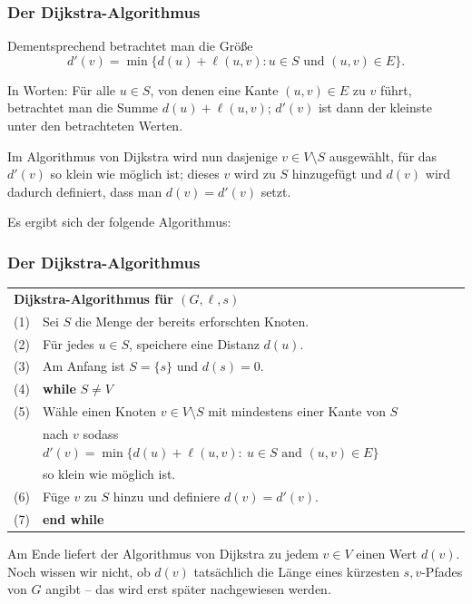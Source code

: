 \documentclass[smaller]{beamer}
\begin{document}
\begin{frame}
\frametitle{Der Dijkstra-Algorithmus}
Dementsprechend betrachtet man die Größe
\[
d'(v) = \min{\big\{ d(u) + \ell(u,v) : u \in S \text{ und } (u,v) \in E \big\}}.
\]

In Worten: Für alle $u \in S$, von denen eine Kante $(u,v) \in E$ zu $v$ führt, betrachtet man die Summe $d(u) + \ell(u,v)$; $d'(v)$ ist dann der kleinste unter den betrachteten Werten. \\ \vspace*{0.2cm}

Im Algorithmus von Dijkstra wird nun dasjenige $v \in V \setminus S$ ausgewählt, für das $d'(v)$ so klein wie möglich ist; dieses $v$ wird zu $S$ hinzugefügt und $d(v)$ wird dadurch definiert, dass man $d(v) = d'(v)$ setzt. \\ \vspace*{0.2cm}

Es ergibt sich der folgende Algorithmus:
\end{frame}

\begin{frame}
\frametitle{Der Dijkstra-Algorithmus}
\begin{center}
\label{page:12:1}
\begin{tabular}{rl}
\multicolumn{2}{l}{\textbf{Dijkstra-Algorithmus für $(G, \ell, s)$}} \\
 (1)& Sei $S$ die Menge der bereits erforschten Knoten. \\
 (2)& Für jedes $u \in S$, speichere eine Distanz $d(u)$. \\
 (3)& Am Anfang ist $S = \{ s \}$ und $d(s)=0$. \\
 (4)& \textbf{while} $S \neq V$ \\
 (5)& \qquad Wähle einen Knoten $v \in V \setminus S$ mit mindestens einer Kante von $S$  \\
    & \qquad nach $v$ sodass $d'(v) = \min{\{ d(u) + \ell(u,v) : \ u \in S \text{ and } (u,v) \in E \}}$ \\
    & \qquad so klein wie möglich ist. \\
 (6)& \qquad Füge $v$ zu $S$ hinzu und definiere $d(v) = d'(v)$. \\
 (7)& \textbf{end while}
\end{tabular}
\end{center}

Am Ende liefert der Algorithmus von Dijkstra zu jedem $v \in V$ einen Wert $d(v)$. Noch wissen wir nicht, ob $d(v)$ tatsächlich die Länge eines kürzesten $s,v$-Pfades von $G$ angibt -- das wird erst später nachgewiesen werden. 
\end{frame}
\end{document}
